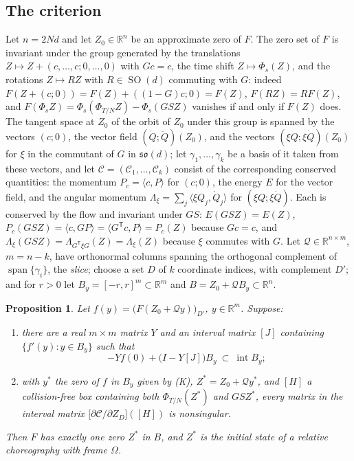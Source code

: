\documentclass[11pt]{amsart}
\newtheorem{proposition}[theorem]{Proposition}
\theoremstyle{definition}
\newcommand{\R}{\mathbb{R}}
\newcommand{\so}{\mathfrak{so}}
\newcommand{\intv}[1]{[#1]}
\DeclareMathOperator{\spn}{span}
\DeclareMathOperator{\SO}{SO}
\DeclareMathOperator{\intr}{int}
\begin{document}
\subsection{The criterion}
Let $n=2Nd$ and let $Z_0\in\R^n$ be an approximate zero of $F$. The zero set of $F$ is invariant under the group generated by the translations $Z\mapsto Z+(c,\dots,c;0,\dots,0)$ with $Gc=c$, the time shift $Z\mapsto\Phi_s(Z)$, and the rotations $Z\mapsto RZ$ with $R\in\SO(d)$ commuting with $G$: indeed $F(Z+(c;0))=F(Z)+((1-G)c;0)=F(Z)$, $F(RZ)=RF(Z)$, and $F(\Phi_sZ)=\Phi_s(\Phi_{T/N}Z)-\Phi_s(GSZ)$ vanishes if and only if $F(Z)$ does. The tangent space at $Z_0$ of the orbit of $Z_0$ under this group is spanned by the vectors $(c;0)$, the vector field $(\dot Q;\ddot Q)(Z_0)$, and the vectors $(\xi Q;\xi\dot Q)(Z_0)$ for $\xi$ in the commutant of $G$ in $\so(d)$; let $\gamma_1,\dots,\gamma_k$ be a basis of it taken from these vectors, and let $\mathcal C=(\mathcal C_1,\dots,\mathcal C_k)$ consist of the corresponding conserved quantities: the momentum $P_c=\langle c,P\rangle$ for $(c;0)$, the energy $E$ for the vector field, and the angular momentum $\Lambda_\xi=\sum_j\langle\xi Q_j,\dot Q_j\rangle$ for $(\xi Q;\xi\dot Q)$. Each is conserved by the flow and invariant under $GS$: $E(GSZ)=E(Z)$, $P_c(GSZ)=\langle c,GP\rangle=\langle G^{\mathsf T}c,P\rangle=P_c(Z)$ because $Gc=c$, and $\Lambda_\xi(GSZ)=\Lambda_{G^{\mathsf T}\xi G}(Z)=\Lambda_\xi(Z)$ because $\xi$ commutes with $G$. Let $\mathcal Q\in\R^{n\times m}$, $m=n-k$, have orthonormal columns spanning the orthogonal complement of $\spn\{\gamma_i\}$, the \emph{slice}; choose a set $D$ of $k$ coordinate indices, with complement $D'$; and for $r>0$ let $B_y=[-r,r]^m\subset\R^m$ and $B=Z_0+\mathcal QB_y\subset\R^n$.

\begin{proposition}\label{prop:krawczyk}
Let $f(y)=\big(F(Z_0+\mathcal Qy)\big)_{D'}$, $y\in\R^m$. Suppose:
\begin{enumerate}
\item[(K)] there are a real $m\times m$ matrix $Y$ and an interval matrix $\intv{J}$ containing $\{f'(y):y\in B_y\}$ such that
\[
-Yf(0)+\big(I-Y\intv{J}\big)B_y\ \subset\ \intr B_y ;
\]
\item[(C)] with $y^*$ the zero of $f$ in $B_y$ given by (K), $Z^*=Z_0+\mathcal Qy^*$, and $\intv{H}$ a collision-free box containing both $\Phi_{T/N}(Z^*)$ and $GSZ^*$, every matrix in the interval matrix $\big[\partial\mathcal C/\partial Z_D\big](\intv{H})$ is nonsingular.
\end{enumerate}
Then $F$ has exactly one zero $Z^*$ in $B$, and $Z^*$ is the initial state of a relative choreography with frame $\Omega$.
\end{proposition}
\end{document}

